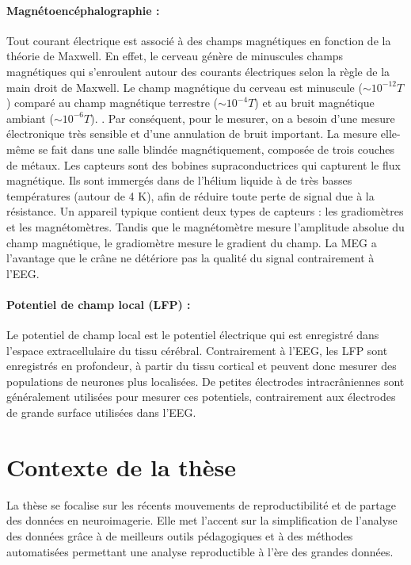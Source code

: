 \paragraph{Magnétoencéphalographie :} Tout courant électrique est associé à des champs magnétiques en fonction de la théorie de Maxwell. En effet, le cerveau génère de minuscules champs magnétiques qui s'enroulent autour des courants électriques selon la règle de la main droit de Maxwell. Le champ magnétique du cerveau est minuscule ($\sim10^{-12}T$) comparé au champ magnétique terrestre ($\sim10^{-4}T$) et au bruit magnétique ambiant ($\sim10^{-6}T$). . Par conséquent, pour le mesurer, on a besoin d'une mesure électronique très sensible et d'une annulation de bruit important. La mesure elle-même se fait dans une salle blindée magnétiquement, composée de trois couches de métaux. Les capteurs sont des bobines supraconductrices qui capturent le flux magnétique. Ils sont immergés dans de l'hélium liquide à de très basses températures (autour de 4 K), afin de réduire toute perte de signal due à la résistance. Un appareil typique contient deux types de capteurs : les gradiomètres et les magnétomètres. Tandis que le magnétomètre mesure l'amplitude absolue du champ magnétique, le gradiomètre mesure le gradient du champ. La MEG a l'avantage que le crâne ne détériore pas la qualité du signal contrairement à l'EEG.

\paragraph{Potentiel de champ local (LFP) :}
Le potentiel de champ local est le potentiel électrique qui est enregistré dans l'espace extracellulaire du tissu cérébral. Contrairement à l'EEG, les LFP sont enregistrés en profondeur, à partir du tissu cortical et peuvent donc mesurer des populations de neurones plus localisées. De petites électrodes intracrâniennes sont généralement utilisées pour mesurer ces potentiels, contrairement aux électrodes de grande surface utilisées dans l'EEG.

\section*{Contexte de la thèse}
La thèse se focalise sur les récents mouvements de reproductibilité et de partage des données en neuroimagerie. Elle met l'accent sur la simplification de l'analyse des données grâce à de meilleurs outils pédagogiques et à des méthodes automatisées permettant une analyse reproductible à l'ère des grandes données.

